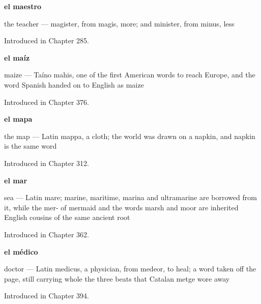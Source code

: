 \noindent\begin{minipage}[t]{\linewidth}
\raggedright
\textbf{el maestro}\par
\small the teacher — magister, from magis, more; and minister, from minus, less\par
\footnotesize Introduced in Chapter 285.
\end{minipage}\par\medskip

\noindent\begin{minipage}[t]{\linewidth}
\raggedright
\textbf{el maíz}\par
\small maize — Taíno mahis, one of the first American words to reach Europe, and the word Spanish handed on to English as maize\par
\footnotesize Introduced in Chapter 376.
\end{minipage}\par\medskip

\noindent\begin{minipage}[t]{\linewidth}
\raggedright
\textbf{el mapa}\par
\small the map — Latin mappa, a cloth; the world was drawn on a napkin, and napkin is the same word\par
\footnotesize Introduced in Chapter 312.
\end{minipage}\par\medskip

\noindent\begin{minipage}[t]{\linewidth}
\raggedright
\textbf{el mar}\par
\small sea — Latin mare; marine, maritime, marina and ultramarine are borrowed from it, while the mer- of mermaid and the words marsh and moor are inherited English cousins of the same ancient root\par
\footnotesize Introduced in Chapter 362.
\end{minipage}\par\medskip

\noindent\begin{minipage}[t]{\linewidth}
\raggedright
\textbf{el médico}\par
\small doctor — Latin medicus, a physician, from medeor, to heal; a word taken off the page, still carrying whole the three beats that Catalan metge wore away\par
\footnotesize Introduced in Chapter 394.
\end{minipage}\par\medskip

